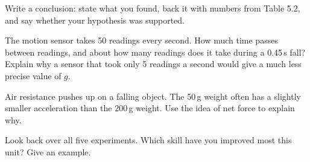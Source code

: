 \task Write a conclusion: state what you found, back it with numbers from Table 5.2, and say whether your hypothesis was supported.


\begin{yr8box}
\begin{keepext}
\exttask The motion sensor takes 50 readings every second. How much time passes between readings, and about how many readings does it take during a 0.45\,s fall? Explain why a sensor that took only 5 readings a second would give a much less precise value of $g$.
\end{keepext}
\begin{keepext}
\exttask Air resistance pushes up on a falling object. The 50\,g weight often has a slightly smaller acceleration than the 200\,g weight. Use the idea of net force to explain why.
\end{keepext}
\end{yr8box}


\begin{skillcheck}
\end{skillcheck}

\task Look back over all five experiments. Which skill have you improved most this unit? Give an example.


